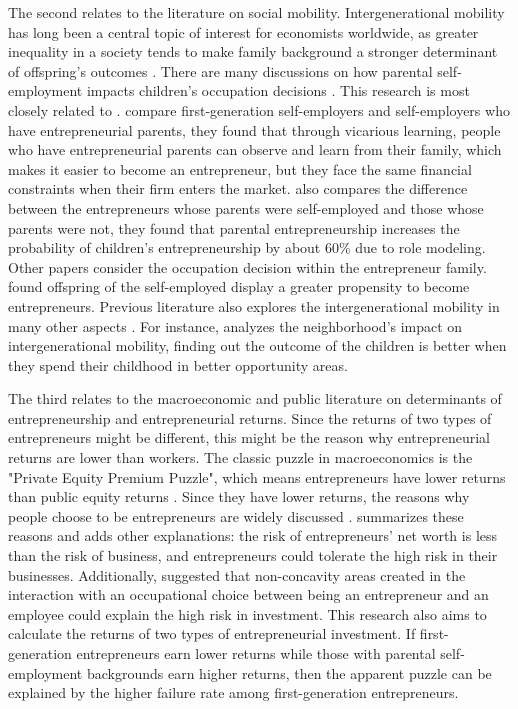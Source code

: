 The second relates to the literature on social mobility. Intergenerational mobility has long been a central topic of interest for economists worldwide, as greater inequality in a society tends to make family background a stronger determinant of offspring’s outcomes \citep{corakIncomeInequalityEquality2013a}. There are many discussions on how parental self-employment impacts children's occupation decisions \citep{dunn2000financial, laferrere2001self, djankov2006china, barnir2011parental, lindquist2015entrepreneurial}. This research is most closely related to \citet{barnir2011parental, lindquist2015entrepreneurial}. \citet{barnir2011parental} compare first-generation self-employers and self-employers who have entrepreneurial parents, they found that through vicarious learning, people who have entrepreneurial parents can observe and learn from their family, which makes it easier to become an entrepreneur, but they face the same financial constraints when their firm enters the market.  \citet{lindquist2015entrepreneurial} also compares the difference between the entrepreneurs whose parents were self-employed and those whose parents were not, they found that parental entrepreneurship increases the probability of children’s entrepreneurship by about 60\% due to role modeling.  Other papers consider the occupation decision within the entrepreneur family. \citet{dunn2000financial, laferrere2001self, djankov2006china} found offspring of the self-employed display a greater propensity to become entrepreneurs. Previous literature also explores the intergenerational mobility in many other aspects \citep{peters1992patterns, checchi1999more}. For instance, \citet{chetty2018impacts} analyzes the neighborhood's impact on intergenerational mobility, finding out the outcome of the children is better when they spend their childhood in better opportunity areas.


The third relates to the macroeconomic and public literature on determinants of entrepreneurship and entrepreneurial returns. Since the returns of two types of entrepreneurs might be different, this might be the reason why entrepreneurial returns are lower than workers. The classic puzzle in macroeconomics is the "Private Equity Premium Puzzle", which means entrepreneurs have lower returns than public equity returns \citep{moskowitz2002returns, bhandari2020survey}. Since they have lower returns, the reasons why people choose to be entrepreneurs are widely discussed \citep{parker2005economics, vereshchagina2009risk}. \citet{parker2005economics} summarizes these reasons and adds other explanations: the risk of entrepreneurs' net worth is less than the risk of business, and entrepreneurs could tolerate the high risk in their businesses. Additionally, \citet{vereshchagina2009risk} suggested that non-concavity areas created in the interaction with an occupational choice between being an entrepreneur and an employee could explain the high risk in investment. This research also aims to calculate the returns of two types of entrepreneurial investment. If first-generation entrepreneurs earn lower returns while those with parental self-employment backgrounds earn higher returns, then the apparent puzzle can be explained by the higher failure rate among first-generation entrepreneurs. 

 




